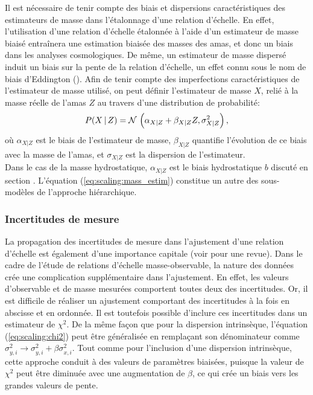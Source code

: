 Il est nécessaire de tenir compte des biais et dispersions caractéristiques des estimateurs de masse dans l'étalonnage d'une relation d'échelle.
En effet, l'utilisation d'une relation d'échelle étalonnée à l'aide d'un estimateur de masse biaisé entraînera une estimation biaisée des masses des amas, et donc un biais dans les analyses cosmologiques.
De même, un estimateur de masse dispersé induit un biais sur la pente de la relation d'échelle, un effet connu sous le nom de biais d'Eddington (\cite{eddington_formula_1913, eddington_correction_1940}).
Afin de tenir compte des imperfections caractéristiques de l'estimateur de masse utilisé, on peut définir l'estimateur de masse $X$, relié à la masse réelle de l'amas $Z$ au travers d'une distribution de probabilité:
\begin{equation}
    \label{eq:scaling:mass_estim}
    P(X\,|\,Z) = \mathcal{N}\, \left(\alpha_{X|Z} + \beta_{X|Z} Z, \sigma_{X|Z}^2\right),
\end{equation}
où $\alpha_{X|Z}$ est le biais de l'estimateur de masse, $\beta_{X|Z}$ quantifie l'évolution de ce biais avec la masse de l'amas, et $\sigma_{X|Z}$ est la dispersion de l'estimateur. \\
Dans le cas de la masse hydrostatique, $\alpha_{X|Z}$ est le biais hydrostatique $b$ discuté en section .
L'équation (\ref{eq:scaling:mass_estim}) constitue un autre des sous-modèles de l'approche hiérarchique.

\subsubsection{Incertitudes de mesure} %

La propagation des incertitudes de mesure dans l'ajustement d'une relation d'échelle est également d'une importance capitale (voir \cite{andreon_measurement_2013} pour une revue).
Dans le cadre de l'étude de relations d'échelle masse-observable, la nature des données crée une complication supplémentaire dans l'ajustement.
En effet, les valeurs d'observable et de masse mesurées comportent toutes deux des incertitudes.
Or, il est difficile de réaliser un ajustement comportant des incertitudes à la fois en abscisse et en ordonnée.
Il est toutefois possible d'inclure ces incertitudes dans un estimateur de $\chi^2$.
De la même façon que pour la dispersion intrinsèque, l'équation (\ref{eq:scaling:chi2}) peut être généralisée en remplaçant son dénominateur comme $\sigma_{y,i}^2 \rightarrow \sigma_{y,i}^2 + \beta \sigma_{x, i}^2$.
Tout comme pour l'inclusion d'une dispersion intrinsèque, cette approche conduit à des valeurs de paramètres biaisées, puisque la valeur de $\chi^2$ peut être diminuée avec une augmentation de $\beta$, ce qui crée un biais vers les grandes valeurs de pente.

